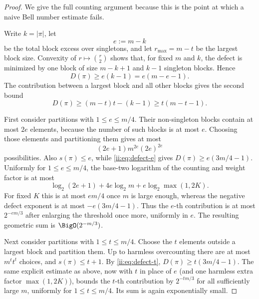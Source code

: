 \begin{proof}
We give the full counting argument because this is the point at which a naive Bell
number estimate fails.

Write $k=|\pi|$, let
\begin{equation}
 e:=m-k
 \label{ii:eq:excess}
\end{equation}
be the total block excess over singletons, and let $r_{\max}=m-t$ be the largest block
size.  Convexity of $r\mapsto\binom r2$ shows that, for fixed $m$ and $k$, the defect
is minimized by one block of size $m-k+1$ and $k-1$ singleton blocks.  Hence
\begin{equation}
 D(\pi)\geq e(k-1)=e(m-e-1).
 \label{ii:eq:defect-e}
\end{equation}
The contribution between a largest block and all other blocks gives the second bound
\begin{equation}
 D(\pi)\geq (m-t)t-(k-1)\geq t(m-t-1).
 \label{ii:eq:defect-t}
\end{equation}

First consider partitions with $1\leq e\leq m/4$.  Their non-singleton blocks contain
at most $2e$ elements, because the number of such blocks is at most $e$.  Choosing
those elements and partitioning them gives at most
\begin{equation}
  (2e+1)m^{2e}(2e)^{2e}
 \label{ii:eq:count-near-singletons}
\end{equation}
possibilities.  Also $s(\pi)\leq e$, while \eqref{ii:eq:defect-e} gives
$D(\pi)\geq e(3m/4-1)$.  Uniformly for $1\leq e\leq m/4$, the base-two logarithm
of the counting and weight factor is at most
\[
 \log_2(2e+1)+4e\log_2m+e\log_2\max(1,2K).
\]
For fixed $K$ this is at most $em/4$ once $m$ is large enough, whereas the
negative defect exponent is at most $-e(3m/4-1)$.  Thus the $e$-th contribution
is at most $2^{-em/3}$ after enlarging the threshold once more, uniformly in
$e$.  The resulting geometric sum is $\BigO(2^{-m/3})$.

Next consider partitions with $1\leq t\leq m/4$.  Choose the $t$ elements outside a
largest block and partition them.  Up to harmless overcounting there are at most
$m^t t^t$ choices, and $s(\pi)\leq t+1$.  By \eqref{ii:eq:defect-t},
$D(\pi)\geq t(3m/4-1)$.  The same explicit estimate as above, now with $t$ in
place of $e$ (and one harmless extra factor $\max(1,2K)$), bounds the $t$-th
contribution by $2^{-tm/3}$ for all sufficiently large $m$, uniformly for
$1\leq t\leq m/4$.  Its sum is again exponentially small.


\end{proof}

